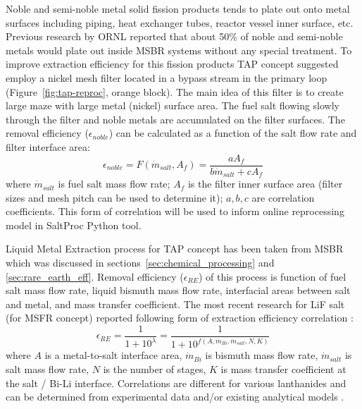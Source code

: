 Noble and semi-noble metal solid fission products tends to plate out onto metal 
surfaces including piping, heat exchanger tubes, reactor vessel inner surface, etc. 
Previous research by \gls{ORNL} \cite{robertson_conceptual_1971} reported that 
about 50\% of noble and semi-noble metals would plate out inside \gls{MSBR} 
systems without any special treatment. To improve extraction efficiency for this 
fission products \gls{TAP} concept suggested employ a nickel mesh filter located 
in a bypass stream in the primary loop (Figure~\ref{fig:tap-reproc}, orange block). 
The main idea of this filter is to create large maze with large metal (nickel) 
surface area. The fuel salt flowing slowly through the filter and noble 
metals are accumulated on the filter surfaces. The removal efficiency 
($\epsilon_{noble}$) can be 
calculated as a function of the salt flow rate and filter interface area:
\begin{equation} \label{eq:filter_eff}
\epsilon_{noble} = F(\dot{m}_{salt}, A_f) = \frac{a A_f}{b \dot{m}_{salt} + c A_f}
\end{equation}
where $\dot{m}_{salt}$ is fuel salt mass flow rate; $A_f$ is the filter inner 
surface area (filter sizes and mesh pitch can be used to determine it); 
$a, b, c$ are correlation coefficients. This form of correlation will be used 
to inform online reprocessing model in SaltProc Python tool.

Liquid Metal Extraction process for \gls{TAP} concept has been taken from 
\gls{MSBR} which was discussed in sections~\ref{sec:chemical_processing} and \ref{sec:rare_earth_eff}. Removal efficiency ($\epsilon_{RE}$) of this process is function 
of fuel salt mass flow rate, liquid bismuth mass flow rate, interfacial areas 
between salt and metal, and mass transfer coefficient. The most recent 
research for LiF salt (for \gls{MSFR} concept) reported following form of 
extraction efficiency correlation \cite{rodrigues_actinide/lanthanide_2015}:
\begin{equation} \label{eq:re_eff}
\epsilon_{RE} = \frac{1}{1+10^{\lambda}} = \frac{1}{1+10^{f(A, \dot{m}_{Bi}, \dot{m}_{salt}, N, K)}}
\end{equation}
where $A$ is a metal-to-salt interface area, $\dot{m}_{Bi}$ is bismuth mass 
flow rate, $\dot{m}_{salt}$ is salt mass flow rate, $N$ is the number of stages, 
$K$ is mass transfer coefficient at the salt / Bi-Li interface. Correlations are 
different for various lanthanides and can be determined from experimental data 
and/or existing analytical models \cite{mcneese_engineering_1971, simon_-line_2008, rodrigues_actinide/lanthanide_2015, delpech_reactor_2009, delpech_possible_2012}.

